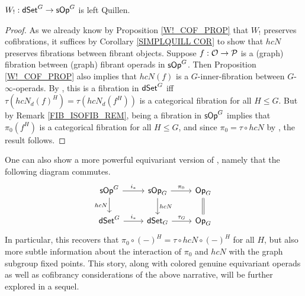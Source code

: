 \documentclass[a4paper,10pt
,draft
]{article}%
\renewcommand{\1}{\eta}%
\begin{document}
\begin{proposition}[{cf. \cite[Prop/ 4.9]{CM11}}]
      $W_!: \mathsf{dSet}^G \to \mathsf{sOp}^G$ is left Quillen.
\end{proposition}
\begin{proof}
      As we already know by Proposition \ref{W!_COF_PROP} that $W_!$ preserves cofibrations,
      it suffices by Corollary \ref{SIMPLQUILL COR} to show that $h c N$ preserves fibrations between fibrant objects.
      Suppose $f: \mathcal{O} \to \mathcal{P}$ is a (graph) fibration between (graph) fibrant operads in $\mathsf{sOp}^G$.
      Then Proposition \ref{W!_COF_PROP} also implies that $h c N (f)$ is a $G$-inner-fibration between $G$-$\infty$-operads.
      By \cite[Thm. 8.22]{Per_eds}, this is a fibration in $\mathsf{dSet}^G$ iff $\tau (h c N_d(f)^H) = \tau (h c N_d(f^H))$ is a categorical fibration for all $H \leq G$.
      But by Remark \ref{FIB_ISOFIB_REM}, being a fibration in $\mathsf{sOp}^G$ implies that $\pi_0(f^H)$ is a categorical fibration for all $H \leq G$, 
      and since $\pi_0 = \tau \circ h c N$ by \cite[Prop. 4.8]{CM11}, the result follows.
\end{proof}

\begin{remark}
      One can also show a more powerful equivariant version of \cite[Prop. 4.8]{CM11},
      namely that the following diagram commutes.
      \begin{equation}
            \begin{tikzcd}
                  \sOp^G \arrow[r, "i_{\**}"] \arrow[d, "h c N"']
                  &
                  \sOp_G \arrow[d, "h c N"] \arrow[r, "\pi_0"]
                  &
                  \Op_G \arrow[d, equal]
                  \\
                  \dSet^G \arrow[r, "i_{\**}"]
                  &
                  \dSet_G \arrow[r, "\tau_G"]
                  &
                  \Op_G
            \end{tikzcd}
      \end{equation}
      In particular, this recovers that $\pi_0 \circ (-)^H = \tau \circ h c N \circ (-)^H$ for all $H$,
      but also more subtle information about the interaction of $\pi_0$ and $h c N$ with the graph subgroup fixed points.
      This story, along with colored genuine equivariant operads as well as cofibrancy considerations of the above narrative,
      will be further explored in a sequel. 
\end{remark}
\end{document}

